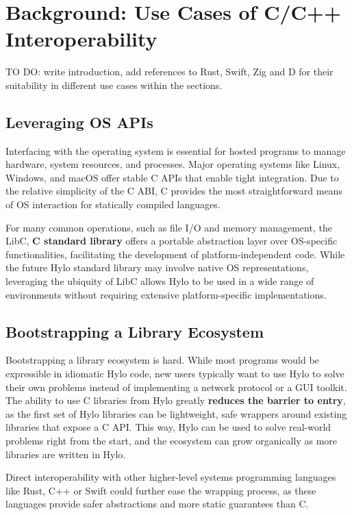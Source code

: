 \section {Background: Use Cases of C/C++ Interoperability}
\label{sec:use_cases_of_interop}
TO DO: write introduction, add references to Rust, Swift, Zig and D for their suitability in different use cases within the sections.

\subsection{Leveraging OS APIs}

Interfacing with the operating system is essential for hosted programs to manage hardware, system resources, and processes. Major operating systems like Linux, Windows, and macOS offer stable C APIs that enable tight integration. Due to the relative simplicity of the C ABI, C provides the most straightforward means of OS interaction for statically compiled languages.

For many common operations, such as file I/O and memory management, the LibC, \textbf{C standard library} \cite{libc} offers a portable abstraction layer over OS-specific functionalities, facilitating the development of platform-independent code. While the future Hylo standard library may involve native OS representations, leveraging the ubiquity of LibC allows Hylo to be used in a wide range of environments without requiring extensive platform-specific implementations.

\subsection{Bootstrapping a Library Ecosystem}
Bootstrapping a library ecosystem is hard. While most programs would be expressible in idiomatic Hylo code, new users typically want to use Hylo to solve their own problems instead of implementing a network protocol or a GUI toolkit. The ability to use C libraries from Hylo greatly \textbf{reduces the barrier to entry}, as the first set of Hylo libraries can be lightweight, safe wrappers around existing libraries that expose a C API. This way, Hylo can be used to solve real-world problems right from the start, and the ecosystem can grow organically as more libraries are written in Hylo.

Direct interoperability with other higher-level systems programming languages like Rust, C++ or Swift could further ease the wrapping process, as these languages provide safer abstractions and more static guarantees than C.

